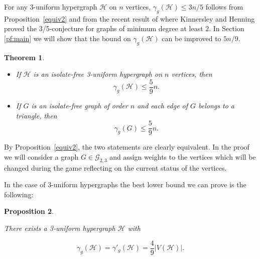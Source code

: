 \documentclass[12pt]{article}
\newtheorem{theorem}{Theorem}[section]
\newtheorem{prop}[theorem]{Proposition}
\newcommand\cG{{\mathcal G}}
\newcommand\cH{{\mathcal H}}
\begin{document}
\bigskip

For any 3-uniform hypergraph $\cH$ on $n$ vertices, $\gamma_g(\cH) \le 3n/5$ follows from Proposition~\ref{equiv2}  and from the recent result of \cite{HK} where Kinnersley and Henning proved the 3/5-conjecture for graphs of minimum degree at least 2.
In Section \ref{pf:main} we will show that the bound on $\gamma_g(\cH)$ can be improved to $5n/9$.

\begin{theorem} \label{5/9}
\begin{itemize}
\item[$(i)$]
If $\cH$ is an isolate-free 3-uniform hypergraph on $n$ vertices, then
$$\gamma_g(\cH)\le \frac{5}{9}n.$$
\item[$(ii)$] 
If $G$ is an isolate-free graph of order
$n$ and each edge of $G$ belongs to a triangle, then
$$\gamma_g(G)\le \frac{5}{9}n.$$
\end{itemize}
\end{theorem}
\medskip
By Proposition~\ref{equiv2}, the two statements are clearly equivalent. In the proof we will consider a graph $G\in \cG_{2,3}$ and assign weights to the vertices which will be changed during the game reflecting on the current status of the vertices. 

\vspace{2mm}

In the case of 3-uniform hypergraphs the best lower bound we can prove is the following:

\begin{prop} \label{3unilower}

There exists a 3-uniform hypergraph $\cH$ with

$$\gamma_g(\cH)=\gamma'_g(\cH)=\frac{4}{9}|V(\cH)|.$$

\end{prop}
\end{document}
